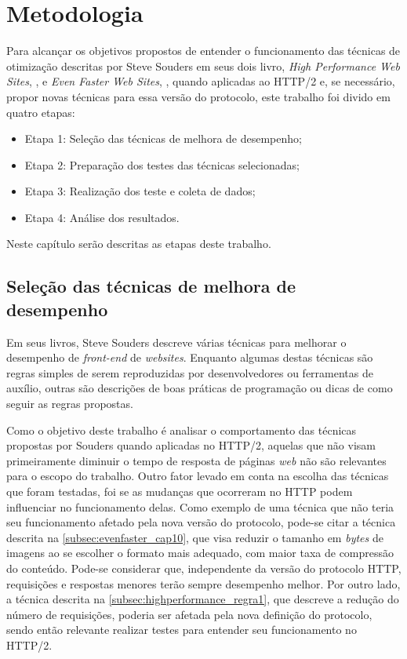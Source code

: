 %
%

\chapter{Metodologia}
\label{chap:metodologia}

Para alcançar os objetivos propostos de entender o funcionamento das técnicas de otimização descritas por Steve Souders em seus dois livro, \textit{High Performance Web Sites}, \cite{HighPerformance}, e \textit{Even Faster Web Sites}, \cite{EvenFaster}, quando aplicadas ao HTTP/2 e, se necessário, propor novas técnicas para essa versão do protocolo, este trabalho foi divido em quatro etapas:

\begin{itemize}
	\item Etapa 1: Seleção das técnicas de melhora de desempenho;
	\item Etapa 2: Preparação dos testes das técnicas selecionadas;
	\item Etapa 3: Realização dos teste e coleta de dados;
	\item Etapa 4: Análise dos resultados.
\end{itemize}

Neste capítulo serão descritas as etapas deste trabalho.

\section{Seleção das técnicas de melhora de desempenho}
\label{sec:selecaodastecnicasdemelhoradedesempenho}

Em seus livros, Steve Souders descreve várias técnicas para melhorar o desempenho de \textit{front-end} de \textit{websites}. Enquanto algumas destas técnicas são regras simples de serem reproduzidas por desenvolvedores ou ferramentas de auxílio, outras são descrições de boas práticas de programação ou dicas de como seguir as regras propostas.

Como o objetivo deste trabalho é analisar o comportamento das técnicas propostas por Souders quando aplicadas no HTTP/2, aquelas que não visam primeiramente diminuir o tempo de resposta de páginas \textit{web} não são relevantes para o escopo do trabalho. Outro fator levado em conta na escolha das técnicas que foram testadas, foi se as mudanças que ocorreram no HTTP podem influenciar no funcionamento delas. Como exemplo de uma técnica que não teria seu funcionamento afetado pela nova versão do protocolo, pode-se citar a técnica descrita na \autoref{subsec:evenfaster_cap10}, que visa reduzir o tamanho em \textit{bytes} de imagens ao se escolher o formato mais adequado, com maior taxa de compressão do conteúdo. Pode-se considerar que, independente da versão do protocolo HTTP, requisições e respostas menores terão sempre desempenho melhor. Por outro lado, a técnica descrita na \autoref{subsec:highperformance_regra1}, que descreve a redução do número de requisições, poderia ser afetada pela nova definição do protocolo, sendo então relevante realizar testes para entender seu funcionamento no HTTP/2.

